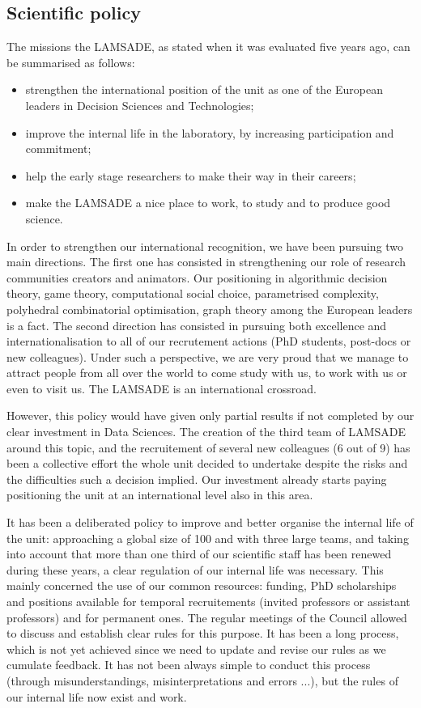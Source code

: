 \subsection{Scientific policy}\label{policy}

The missions the LAMSADE, as stated when it was evaluated five years ago, can be summarised as follows:
\begin{itemize}
\item strengthen the international position of the unit as one of the European leaders in Decision Sciences and Technologies;
\item improve the internal life in the laboratory, by increasing participation and commitment;
\item help the early stage researchers to make their way in their careers;
\item make the LAMSADE a nice place to work, to study and to produce good science.
\end{itemize}

In order to strengthen our international recognition, we have been pursuing two main directions. The first one has consisted in strengthening our role of research communities creators and animators. Our positioning in algorithmic decision theory, game theory, computational social choice, parametrised complexity, polyhedral combinatorial optimisation, graph theory among the European leaders is a fact. The second direction has consisted in pursuing both excellence and internationalisation to all of our recrutement actions (PhD students, post-docs or new colleagues). Under such a perspective, we are very proud that we manage to attract people from all over the world to come study with us, to work with us or even to visit us. The LAMSADE is an international crossroad.

However, this policy would have given only partial results if not completed by our clear investment in Data Sciences. The creation of the third team of LAMSADE around this topic, and the recruitement of several new colleagues (6 out of 9) has been a collective effort the whole unit decided to undertake despite the risks and the difficulties such a decision implied. Our investment already starts paying positioning the unit at an international level also in this area.

It has been a deliberated policy to improve and better organise the internal life of the unit: approaching a global size of 100 and with three large teams, and taking into account that more than one third of our scientific staff has been renewed during these years, a clear regulation of our internal life was necessary. This mainly concerned the use of our common resources: funding, PhD scholarships and positions available for temporal recruitements (invited professors or assistant professors) and for permanent ones. The regular meetings of the Council allowed to discuss and establish clear rules for this purpose. It has been a long process, which is not yet achieved since we need to update and revise our rules as we cumulate feedback. It has not been always simple to conduct this process (through misunderstandings, misinterpretations and errors ...), but the rules of our internal life now exist and work.

